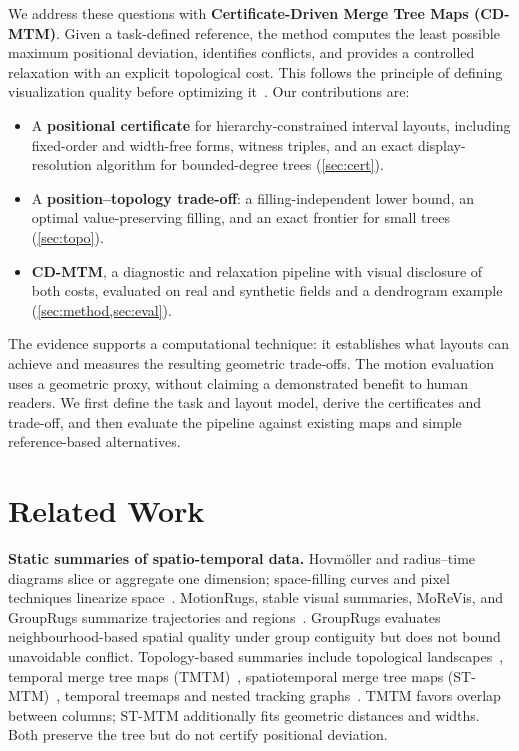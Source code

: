 \documentclass[review]{vgtc}                 %
\begin{document}
We address these questions with \textbf{Certificate-Driven Merge Tree Maps (CD-MTM)}. Given a task-defined reference, the method computes the least possible maximum positional deviation, identifies conflicts, and provides a controlled relaxation with an explicit topological cost. This follows the principle of defining visualization quality before optimizing it~\cite{Meulemans:2026:AP}. Our contributions are:
\begin{itemize}
\item A \textbf{positional certificate} for hierarchy-constrained interval layouts, including fixed-order and width-free forms, witness triples, and an exact display-resolution algorithm for bounded-degree trees (\cref{sec:cert}).
\item A \textbf{position--topology trade-off}: a filling-independent lower bound, an optimal value-preserving filling, and an exact frontier for small trees (\cref{sec:topo}).
\item \textbf{CD-MTM}, a diagnostic and relaxation pipeline with visual disclosure of both costs, evaluated on real and synthetic fields and a dendrogram example (\cref{sec:method,sec:eval}).
\end{itemize}

The evidence supports a computational technique: it establishes what layouts can achieve and measures the resulting geometric trade-offs. The motion evaluation uses a geometric proxy, without claiming a demonstrated benefit to human readers. We first define the task and layout model, derive the certificates and trade-off, and then evaluate the pipeline against existing maps and simple reference-based alternatives.

\section{Related Work}

\textbf{Static summaries of spatio-temporal data.}
Hovm\"oller and radius--time diagrams slice or aggregate one dimension; space-filling curves and pixel techniques linearize space~\cite{Franke:2021:1DP,Zhou:2021:DSF,Keim:2000:PIX}. MotionRugs, stable visual summaries, MoReVis, and GroupRugs summarize trajectories and regions~\cite{Buchmueller:2019:MR,Wulms:2021:SVS,Valdrighi:2024:MRV,Stolk:2025:GR}. GroupRugs evaluates neighbourhood-based spatial quality under group contiguity but does not bound unavoidable conflict. Topology-based summaries include topological landscapes~\cite{Weber:2007:TL,Beketayev:2012:GPTL}, temporal merge tree maps (TMTM)~\cite{Koepp:2023:TMTM}, spatiotemporal merge tree maps (ST-MTM)~\cite{STMTM:2026}, temporal treemaps and nested tracking graphs~\cite{Koepp:2019:TT,Lukasczyk:2017:NTG}. TMTM favors overlap between columns; ST-MTM additionally fits geometric distances and widths. Both preserve the tree but do not certify positional deviation.
\end{document}
